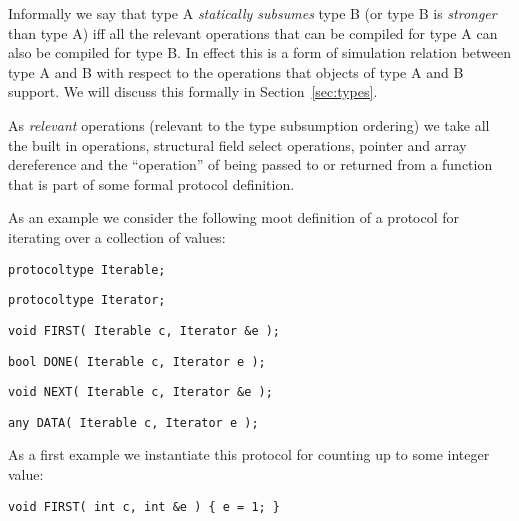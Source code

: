 \documentclass{sigplanconf}
\newcommand{\concept}[1]{\emph{#1}}
\begin{document}
Informally we say that type A \concept{statically subsumes} type B (or
type B is \concept{stronger} than type A) iff all the relevant
operations that can be compiled for type A can also be compiled for
type B. In effect this is a form of simulation relation between type A
and B with respect to the operations that objects of type A and B
support. We will discuss this formally in Section~\ref{sec:types}.

As \emph{relevant} operations (relevant to the type subsumption
ordering) we take all the built in operations, structural field select
operations, pointer and array dereference and the ``operation'' of
being passed to or returned from a function that is part of some
formal protocol definition.

As an example we consider the following {\sc moot}
definition of a protocol for iterating over a collection of values:
\begin{samepage}
\begin{verbatim}
protocoltype Iterable;
\end{verbatim}
\end{samepage}
\begin{samepage}
\begin{verbatim}
protocoltype Iterator;
\end{verbatim}
\end{samepage}
\begin{samepage}
\begin{verbatim}
void FIRST( Iterable c, Iterator &e );
\end{verbatim}
\end{samepage}
\begin{samepage}
\begin{verbatim}
bool DONE( Iterable c, Iterator e );
\end{verbatim}
\end{samepage}
\begin{samepage}
\begin{verbatim}
void NEXT( Iterable c, Iterator &e );
\end{verbatim}
\end{samepage}
\begin{samepage}
\begin{verbatim}
any DATA( Iterable c, Iterator e );
\end{verbatim}
\end{samepage}
As a first example we instantiate this protocol for counting up to
some integer value:
\begin{samepage}
\begin{verbatim}
void FIRST( int c, int &e ) { e = 1; }
\end{verbatim}
\end{samepage}
\end{document}
